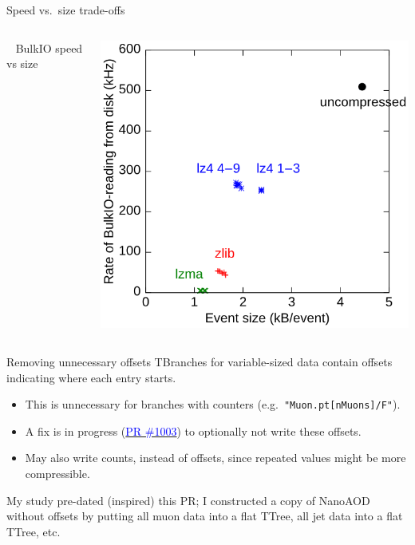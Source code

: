 \documentclass[aspectratio=169]{beamer}
\begin{document}
\begin{frame}{Speed vs.\ size trade-offs}
\begin{columns}
\vspace{2 cm}

\mbox{ } \hfill BulkIO speed vs size \hfill \mbox{ }

\includegraphics[width=\linewidth]{bulk.png}
\end{columns}
\end{frame}

\begin{frame}{Removing unnecessary offsets}
\vspace{0.5 cm}
TBranches for variable-sized data contain offsets indicating where each entry starts.
\begin{itemize}
\item This is unnecessary for branches with counters (e.g.\ {\tt "Muon.pt[nMuons]/F"}).
\item A fix is in progress (\href{https://github.com/root-project/root/pull/1003}{\textcolor{blue}{PR \#1003}}) to optionally not write these offsets.
\item May also write counts, instead of offsets, since repeated values might be more compressible.
\end{itemize}

\vspace{0.5 cm}
\begin{center}
\begin{minipage}{0.7\linewidth}
My study pre-dated (inspired) this PR; I constructed a copy of NanoAOD without offsets by putting all muon data into a flat TTree, all jet data into a flat TTree, etc.
\end{minipage}
\end{center}
\end{frame}
\end{document}

